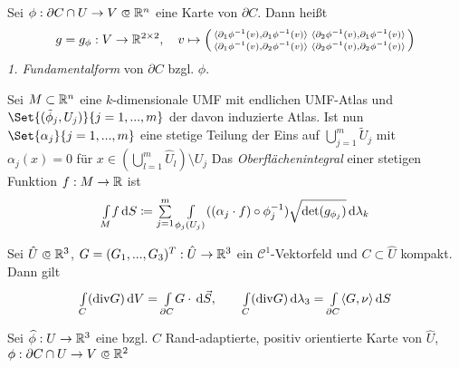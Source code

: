 \documentclass{cheat-sheet}
\newcommand{\divergence}{\mathrm{div}} %
\theoremstyle{definition}
\begin{document}
\begin{defn}
  Sei $\phi : \partial C \cap U \to V \opn \R^n$ eine Karte von $\partial C$. Dann heißt
  \[
    g = g_\phi : V \to \mathbb{R}^{2 \times 2}, \quad
    v \mapsto \left( \begin{smallmatrix}
      \langle \partial_1 \phi^{-1}(v), \partial_1 \phi^{-1}(v) \rangle &
      \langle \partial_2 \phi^{-1}(v), \partial_1 \phi^{-1}(v) \rangle \\
      \langle \partial_1 \phi^{-1}(v), \partial_2 \phi^{-1}(v) \rangle &
      \langle \partial_2 \phi^{-1}(v), \partial_2 \phi^{-1}(v) \rangle
    \end{smallmatrix} \right)
  \]
  \emph{1. Fundamentalform} von $\partial C$ bzgl. $\phi$.
\end{defn}

\begin{defn}
  Sei $M \subset \mathbb{R}^n$ eine $k$-dimensionale UMF mit endlichen UMF-Atlas und $\Set{(\tilde{\phi}_j, U_j)}{j=1, ..., m}$ der davon induzierte Atlas. Ist nun $\Set{\alpha_j}{j = 1,...,m}$ eine stetige Teilung der Eins auf $\bigcup_{j=1}^m \tilde{U}_j$ mit $\alpha_j(x) = 0$ für $x \in (\bigcup_{l=1}^m \hat{U}_l) \setminus U_j$
  Das \emph{Oberflächenintegral} einer stetigen Funktion $f : M \to \mathbb{R}$ ist
  \[ \Int{M}{}{f}{S} \coloneqq \sum_{j=1}^m \Int{\phi_j(U_j)}{}{((\alpha_j \cdot f) \circ \phi_j^{-1}) \sqrt{\det(g_{\phi_j})}}{\lambda_k} \]
\end{defn}

\begin{satz}
  Sei $\hat{U} \opn \R^3$, $G = (G_1, ..., G_3)^T : \hat{U} \to \mathbb{R}^3$ ein $\mathcal{C}^1$-Vektorfeld und $C \subset \hat{U}$ kompakt. Dann gilt
  \[
    \Int{C}{}{(\divergence G)}{V} = \Int{\partial C}{}{G \cdot}{\vec{S}}, \qquad
    \Int{C}{}{(\divergence G)}{\lambda_3} = \Int{\partial C}{}{\langle G, \nu \rangle}{S}
  \]
\end{satz}

\iffalse
  Gegeben durch:
  $u(x) \coloneqq \sum_{j=1}^n \det(e_j, \partial_1 \phi^{-1}(\phi(x)), ..., \partial_{n {-} 1} \phi^{-1} (\phi(x))) e_j$
  $\nu(x) \coloneqq \tfrac{u(x)}{\norm{u(x)}}$ (unabhängig von pos. orientierter Karte)
  Im Fall $n = 3$ ist $u(x) = \partial_1 \phi^{-1}(\phi(x)) \times \partial_x \phi^{-1}(\phi(x))$
  Im Fall $n=3$:
  $G = (G_1, G_2, G_3) : \widehat{U} \to \R^3$ $\mathcal{C}^1$, $\widehat{U} \opn \R^3$
  Bekannt: $\d (G \cdot \d S) = \divergence (G) \d V$
\fi

\iffalse
  Sei $\widehat{\phi} : U \to \mathbb{R}^3$ eine bzgl. $C$ Rand-adaptierte, positiv orientierte Karte von $\widehat{U}$, $\phi : \partial C \cap U \to V \opn \R^2$
\end{document}
